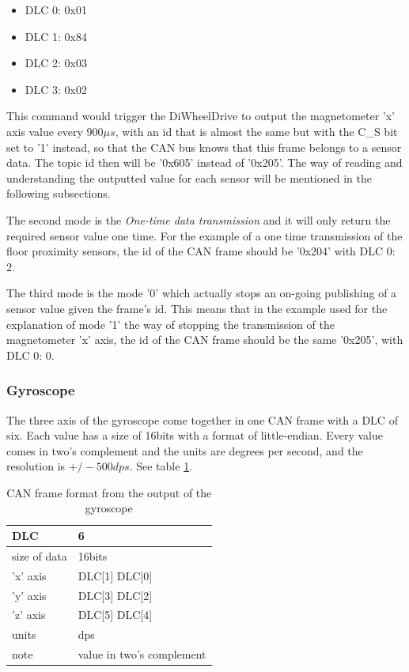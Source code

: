 \documentclass[12pt]{report}%
\begin{document}
\begin{itemize}
	\item DLC 0: 0x01
	\item DLC 1: 0x84
	\item DLC 2: 0x03
	\item DLC 3: 0x02
\end{itemize}

This command would trigger the DiWheelDrive to output the magnetometer 'x' axis value every $900\mu s$, with an id that is almost the same but with the C\_S bit set to '1' instead, so that the CAN bus knows that this frame belongs to a sensor data. The topic id then will be '0x605' instead of '0x205'. The way of reading and understanding the outputted value for each sensor will be mentioned in the following subsections.

The second mode is the \textit{One-time data transmission} and it will only return the required sensor value one time. For the example of a one time transmission of the floor proximity sensors, the id of the CAN frame should be '0x204' with DLC 0: 2.

The third mode is the mode '0' which actually stops an on-going publishing of a sensor value given the frame's id. This means that in the example used for the explanation of mode '1' the way of stopping the transmission of the magnetometer 'x' axis, the id of the CAN frame should be the same '0x205', with DLC 0: 0.

\subsubsection{Gyroscope}
The three axis of the gyroscope come together in one CAN frame with a DLC of six. Each value has a size of 16bits with a format  of little-endian. Every value comes in two's complement and the units are degrees per second, and the resolution is $+/-500 dps$. See table \ref{tab:gyroscope}.

\begin{table}[h!]
\centering
\begin{tabular}{|l|l|}
	\hline
	DLC						&	6													\\	\hline
	size of data	&	16bits										\\	\hline
	'x' axis			&	DLC[1] DLC[0]							\\	\hline
	'y'	axis			&	DLC[3] DLC[2]							\\	\hline
	'z'	axis			&	DLC[5] DLC[4]							\\	\hline
	units					&	dps												\\	\hline
	note					& value in two's complement \\	\hline
\end{tabular}
\caption{\label{tab:gyroscope} CAN frame format from the output of the gyroscope}
\end{table}
\end{document}
